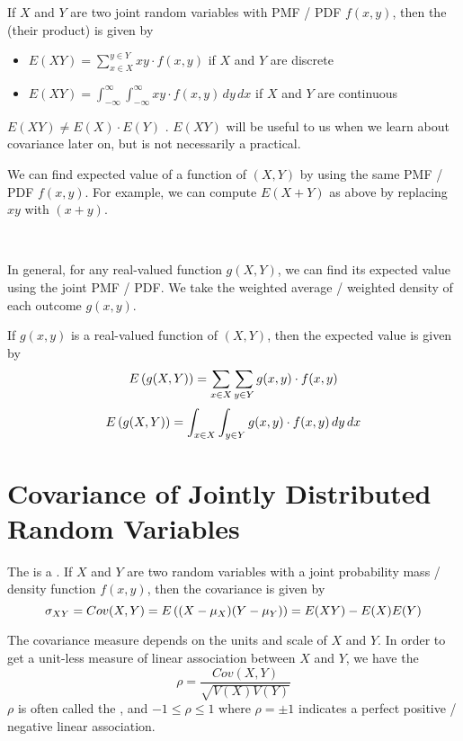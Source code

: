 \begin{definition}
    If $X$ and $Y$ are two joint random variables with PMF / PDF $f(x, y)$, then the  (their product) is given by 

    \begin{itemize}
        \item $E(XY) = \sum_{x \in X}^{y \in Y} xy \cdot f(x, y)$ if $X$ and $Y$ are discrete
        \item $E(XY) = \int_{-\infty}^\infty \int_{-\infty}^\infty xy \cdot f(x, y) \,dy \,dx$ if $X$ and $Y$ are continuous 
    \end{itemize}
\end{definition}

 $E(XY) \neq E(X) \cdot E(Y)$ . $E(XY)$ will be useful to us when we learn about covariance later on, but is not necessarily a practical. 

We can find  expected value of a function of $(X, Y)$ by using the same PMF / PDF $f(x, y)$. For example, we can compute $E(X + Y)$ as above by replacing $xy$ with $(x + y)$.

{~~~}

In general, for any real-valued function $g(X, Y)$, we can find its expected value using the joint PMF / PDF. We take the weighted average / weighted density of each outcome $g(x, y)$.

\begin{definition}
    If $g(x, y)$ is a real-valued function of $(X, Y)$, then the expected value is given by 
    $$E\left(g(X, Y)\right) = \sum_{x \in X} \sum_{y \in Y} g(x, y) \cdot f(x, y)$$
    $$E\left(g(X, Y)\right) = \int_{x \in X} \int_{y \in Y} g(x, y) \cdot f(x, y) \,dy \,dx$$
\end{definition}

\section{Covariance of Jointly Distributed Random Variables}

\begin{definition}[Covariance of $X$, $Y$]
    The  is a . If $X$ and $Y$ are two random variables with a joint probability mass / density function $f(x, y)$, then the covariance is given by $$\sigma_{XY} = Cov(X, Y) = E\left((X - \mu_X)(Y - \mu_Y)\right) = E(XY) - E(X)E(Y)$$
    
    The covariance measure depends on the units and scale of $X$ and $Y$. In order to get a unit-less measure of linear association between $X$ and $Y$, we have the  $$\rho = \frac{Cov(X, Y)}{\sqrt{V(X)V(Y)}}$$ $\rho$ is often called the , and $-1 \le \rho \le 1$ where $\rho = \pm 1$ indicates a perfect positive / negative linear association. 
\end{definition}

